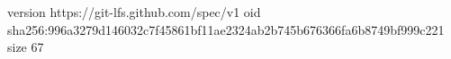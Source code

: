 version https://git-lfs.github.com/spec/v1
oid sha256:996a3279d146032c7f45861bf11ae2324ab2b745b676366fa6b8749bf999c221
size 67
